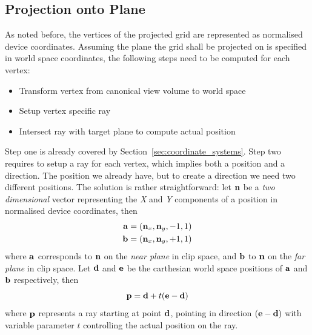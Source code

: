 \subsection{Projection onto Plane}
As noted before, the vertices of the projected grid are represented as normalised
device coordinates. Assuming the plane the grid shall be projected on is specified
in world space coordinates, the following steps need to be computed for each vertex:
\begin{itemize}
 \item Transform vertex from canonical view volume to world space
 \item Setup vertex specific ray
 \item Intersect ray with target plane to compute actual position
\end{itemize}
Step one is already covered by Section~\ref{sec:coordinate_systems}. Step two
requires to setup a ray for each vertex, which implies both a position and a
direction. The position we already have, but to create a direction we need two
different positions. The solution is rather straightforward: let $\mathbf{n}$ be
a \textit{two dimensional} vector representing the \textit{X} and \textit{Y}
components of a position in normalised device coordinates, then
\begin{align}
 \mathbf{a} & = (\mathbf{n}_x, \mathbf{n}_y, -1, 1)\\
 \mathbf{b} & = (\mathbf{n}_x, \mathbf{n}_y, +1, 1)
\end{align}
where $\mathbf{a}$ corresponds to $\mathbf{n}$ on the \textit{near plane} in clip space,
and $\mathbf{b}$ to $\mathbf{n}$ on the \textit{far plane} in clip space. Let $\mathbf{d}$
and $\mathbf{e}$ be the carthesian world space positions of $\mathbf{a}$ and $\mathbf{b}$
respectively, then
\begin{equation}
 \label{eq:proj_grid_ray}
 \mathbf{p} = \mathbf{d} + t(\mathbf{e} - \mathbf{d})
\end{equation}
where $\mathbf{p}$ represents a ray starting at point $\mathbf{d}$, pointing in direction
$(\mathbf{e} - \mathbf{d})$ with variable parameter $t$ controlling the actual position on
the ray.\\

